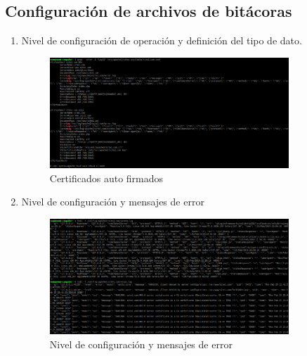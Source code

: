 \subsection{Configuración de archivos de bitácoras}
	\begin{enumerate}
		\item Nivel de configuración de operación y definición del tipo de dato.
			\begin{figure}[htbp]
				\centering
				\includegraphics[width=9cm]{./img/lista/15.png}
				\caption[Certificados auto firmados]{Certificados auto firmados}
				\label{fig:15}
			\end{figure}
		\item Nivel de configuración y mensajes de error
			\begin{figure}[htbp]
				\centering
				\includegraphics[width=9cm]{./img/lista/16.png}
				\caption[Nivel de configuración y mensajes de error]{Nivel de configuración y mensajes de error}
				\label{fig:16}
			\end{figure}
	\end{enumerate}

